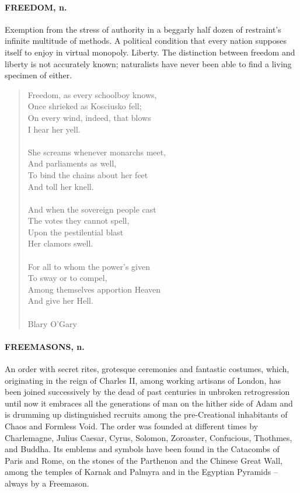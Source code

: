 \documentclass[11pt]{article}
\begin{document}
\paragraph{FREEDOM, n.}  Exemption from the stress of authority in a beggarly half
dozen of restraint's infinite multitude of methods.  A political
condition that every nation supposes itself to enjoy in virtual
monopoly.  Liberty.  The distinction between freedom and liberty is
not accurately known; naturalists have never been able to find a
living specimen of either.

\begin{quote}   Freedom, as every schoolboy knows, \\
      Once shrieked as Kosciusko fell; \\
  On every wind, indeed, that blows \\
          I hear her yell. \\
 \\
  She screams whenever monarchs meet, \\
      And parliaments as well, \\
  To bind the chains about her feet \\
          And toll her knell. \\
 \\
  And when the sovereign people cast \\
      The votes they cannot spell, \\
  Upon the pestilential blast \\
          Her clamors swell. \\
 \\
  For all to whom the power's given \\
      To sway or to compel, \\
  Among themselves apportion Heaven \\
          And give her Hell. \\
 \\
Blary O'Gary \end{quote}


\paragraph{FREEMASONS, n.}  An order with secret rites, grotesque ceremonies and
fantastic costumes, which, originating in the reign of Charles II,
among working artisans of London, has been joined successively by the
dead of past centuries in unbroken retrogression until now it embraces
all the generations of man on the hither side of Adam and is drumming
up distinguished recruits among the pre-Creational inhabitants of
Chaos and Formless Void.  The order was founded at different times by
Charlemagne, Julius Caesar, Cyrus, Solomon, Zoroaster, Confucious,
Thothmes, and Buddha.  Its emblems and symbols have been found in the
Catacombs of Paris and Rome, on the stones of the Parthenon and the
Chinese Great Wall, among the temples of Karnak and Palmyra and in the
Egyptian Pyramids -- always by a Freemason.
\end{document}

